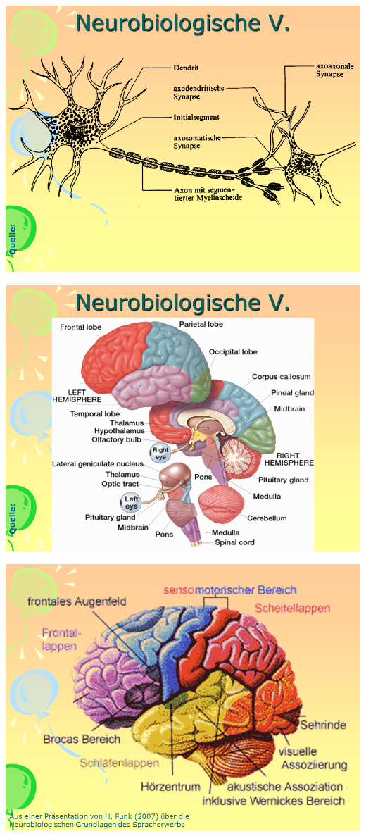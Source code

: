 \documentclass[
  letterpaper,
]{scrbook}
\begin{document}
\includegraphics[width=1\textwidth,height=\textheight]{./pictures/neuro/Diapozitiv25.PNG}

\includegraphics[width=1\textwidth,height=\textheight]{./pictures/neuro/Diapozitiv26.PNG}

\includegraphics[width=1\textwidth,height=\textheight]{./pictures/neuro/Diapozitiv27.PNG}
\end{document}
